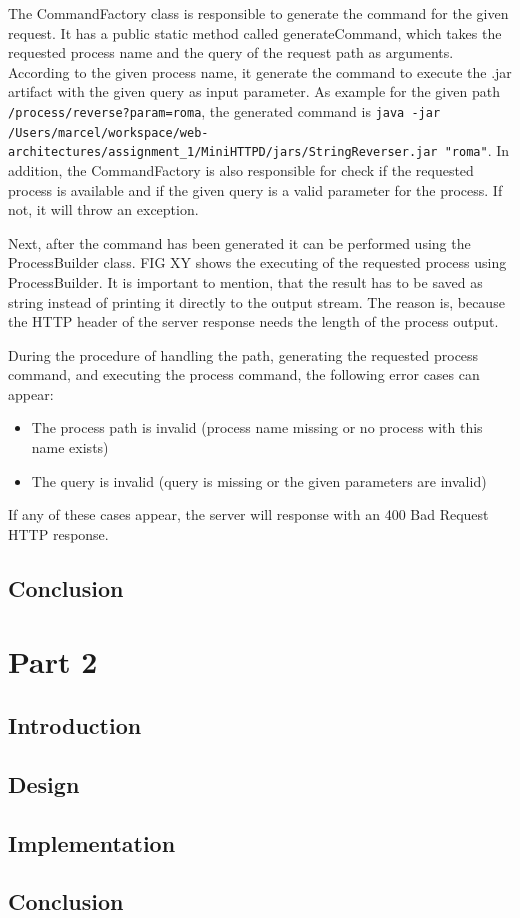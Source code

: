 \documentclass{article}
\begin{document}
The CommandFactory class is responsible to generate the command for the given request. It has a public static method called generateCommand, which takes the requested process name and the query of the request path as arguments.
According to the given process name, it generate the command to execute the .jar artifact with the given query as input parameter.
As example for the given path \texttt{/process/reverse?param=roma}, the generated command is \texttt{java -jar /Users/marcel/workspace/web-architectures/assignment\_1/MiniHTTPD/jars/StringReverser.jar "roma"}. In addition, the CommandFactory is also responsible for check if the requested process is available and if the given query is a valid parameter for the process. If not, it will throw an exception.


Next, after the command has been generated it can be performed using the ProcessBuilder class.
FIG XY shows the executing of the requested process using ProcessBuilder. It is important to mention, that the result has to be saved as string instead of printing it directly to the output stream. The reason is, because the HTTP header of the server response needs the length of the process output.


During the procedure of handling the path, generating the requested process command, and executing the process command, the following error cases can appear:
\begin{itemize}
\item The process path is invalid (process name missing or no process with this name exists)
\item The query is invalid (query is missing or the given parameters are invalid)
\end{itemize}
If any of these cases appear, the server will response with an 400 Bad Request HTTP response.


\subsection{Conclusion}\label{subsec:01_part1_concl}




\section{Part 2}\label{sec:02_part2}

\subsection{Introduction}\label{subsec:02_part2_intro}

\subsection{Design}\label{subsec:02_part2_design}

\subsection{Implementation}\label{subsec:02_part2_impl}

\subsection{Conclusion}\label{subsec:02_part2_concl}



\end{document}
